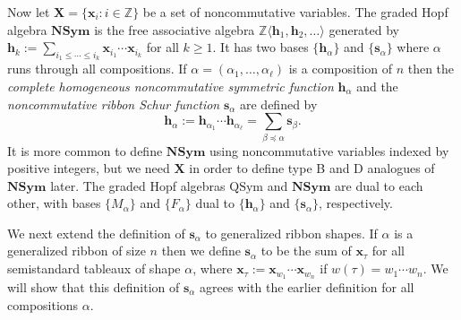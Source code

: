 \documentclass{amsart}
\newtheorem*{Young's Rule}{Young's Rule}
\theoremstyle{definition}
\theoremstyle{remark}
\numberwithin{equation}{section}
\begin{document}
Now let ${\mathbf{X}}=\{{{\mathbf x}}_i:i\in{{\mathbb Z}}\}$ be a set of noncommutative variables. The graded Hopf algebra ${\mathbf{NSym}}$ is the free associative algebra ${{\mathbb Z}}\langle{{\mathbf h}}_1,{{\mathbf h}}_2,\ldots\rangle$ generated by ${{\mathbf h}}_k:=\sum_{i_1\leq\cdots\leq i_k}{{\mathbf x}}_{i_1}\cdots {{\mathbf x}}_{i_k}$ for all $k\ge1$. It has two bases $\{{{\mathbf h}}_\alpha\}$ and $\{{{\mathbf s}}_\alpha\}$ where $\alpha$ runs through all compositions. If $\alpha=(\alpha_1,\ldots,\alpha_\ell)$ is a composition of $n$ then the \emph{complete homogeneous noncommutative symmetric function} ${{\mathbf h}}_\alpha$ and the \emph{noncommutative ribbon Schur function} ${{\mathbf s}}_\alpha$ are defined by\begin{equation}\label{eq:bhbs}
{{\mathbf h}}_\alpha:={{\mathbf h}}_{\alpha_1}\cdots {{\mathbf h}}_{\alpha_\ell} = \sum_{\beta{\operatorname{\preccurlyeq}} \alpha}{{\mathbf s}}_\beta.
\end{equation}
It is more common to define ${\mathbf{NSym}}$ using noncommutative variables indexed by positive integers, but we need ${\mathbf{X}}$ in order to define type B and D analogues of ${\mathbf{NSym}}$ later.
The graded Hopf algebras ${\mathrm{QSym}}$ and ${\mathbf{NSym}}$ are dual to each other, with bases $\{M_\alpha\}$ and $\{F_\alpha\}$ dual to $\{{{\mathbf h}}_\alpha\}$ and $\{{{\mathbf s}}_\alpha\}$, respectively.

We next extend the definition of ${{\mathbf s}}_\alpha$ to generalized ribbon shapes. If $\alpha$ is a generalized ribbon of size $n$ then we define ${{\mathbf s}}_\alpha$ to be the sum of ${{\mathbf x}}_\tau$ for all semistandard tableaux of shape $\alpha$, where ${{\mathbf x}}_\tau:={{\mathbf x}}_{w_1}\cdots{{\mathbf x}}_{w_n}$ if $w(\tau)=w_1\cdots w_n$. We will show that this definition of ${{\mathbf s}}_\alpha$ agrees with the earlier definition for all compositions $\alpha$. 
\end{document}
